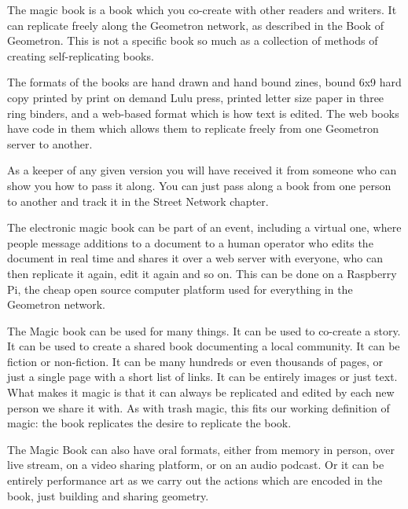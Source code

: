 The magic book is a book which you co-create with other readers and writers.  It can replicate freely along the Geometron network, as described in the Book of Geometron.  This is not a specific book so much as a collection of methods of creating self-replicating books.  

The formats of the books are hand drawn and hand bound zines, bound 6x9 hard copy printed by print on demand Lulu press, printed letter size paper in three ring binders, and a web-based format which is how text is edited.  The web books have code in them which allows them to replicate freely from one Geometron server to another.  

As a keeper of any given version you will have received it from someone who can show you how to pass it along.  You can just pass along a book from one person to another and track it in the Street Network chapter. 

The electronic magic book can be part of an event, including a virtual one, where people message additions to a document to a human operator who edits the document in real time and shares it over a web server with everyone, who can then replicate it again, edit it again and so on.  This can be done on a Raspberry Pi, the cheap open source computer platform used for everything in the Geometron network. 

The Magic book can be used for many things. It can be used to co-create a story.  It can be used to create a shared book documenting a local community. It can be fiction or non-fiction.  It can be many hundreds or even thousands of pages, or just a single page with a short list of links.  It can be entirely images or just text.  What makes it magic is that it can always be replicated and edited by each new person we share it with.  As with trash magic, this fits our working definition of magic: the book replicates the desire to replicate the book.  

The Magic Book can also have oral formats, either from memory in person, over live stream, on a video sharing platform, or on an audio podcast.  Or it can be entirely performance art as we carry out the actions which are encoded in the book, just building and sharing geometry. 

